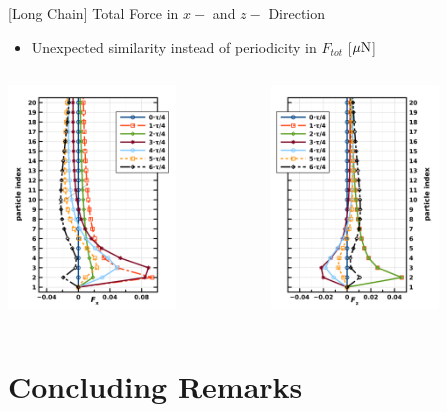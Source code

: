 \documentclass[t,presentation]{beamer}
\begin{document}
\begin{frame}[label={sec:orgf0ccd2c}]{[Long Chain] Total Force  in \(x-\) and \(z-\) Direction}
\begin{itemize}
\item Unexpected similarity instead of periodicity in  \(F_{tot}\) [\(\mu\rm{N}\)]
\end{itemize}
\begin{columns}[c]
\begin{column}{.45\textwidth}
\centering
\includegraphics[width=1.75in]{figures/cXpvdf1000FTS.png}\par
\end{column}
\begin{column}{.45\textwidth} %
\centering
\includegraphics[width=1.75in]{figures/cZpvdf1000FTS.png}\par
\end{column}
\end{columns}
\end{frame}

\section{Concluding Remarks}
\label{sec:org3c1e452}
\end{document}
